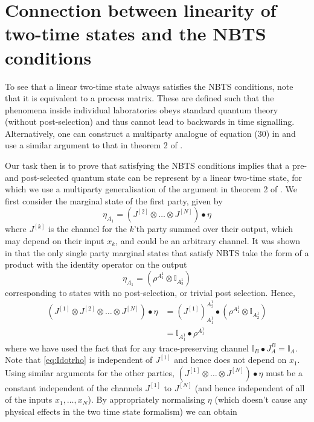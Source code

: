 \documentclass[aps,pra, twocolumn]{revtex4-1}
\begin{document}
\section{Connection between linearity of two-time states and the NBTS conditions} \label{ap:linearNBTS} 

To see that a linear two-time state always satisfies the NBTS conditions, note that it is equivalent to a process matrix. These are defined such that the phenomena inside individual laboratories obeys standard quantum theory (without post-selection) and thus cannot lead to backwards in time signalling. Alternatively, one can construct a multiparty analogue of equation (30) in \cite{polytope} and use a similar argument to that in theorem 2 of \cite{connectingprocesandtwotime}. 

Our task then is to prove that satisfying the NBTS conditions implies that a pre- and post-selected quantum state can be represent by a linear two-time state, for which we use a multiparty generalisation of the argument in theorem 2 of \cite{connectingprocesandtwotime}. We first consider the marginal state of the first party, given by 
\begin{equation}
\eta_{A_1}=(J^{[2]} \otimes \ldots \otimes  J^{[N]}) \bullet  \eta 
\end{equation}
where $J^{[k]}$ is the channel for the $k$'th party summed over their output, which may depend on their input $x_k$, and could be an arbitrary channel. It was shown in \cite{connectingprocesandtwotime} that the only single party marginal states that satisfy NBTS take the form of a product with the identity operator on the output
\begin{equation}
\eta_{A_1} = (\rho^{A_1^1} \otimes \mathbb{I}_{A_2^1})
\end{equation}
corresponding to states with no post-selection, or trivial post selection. Hence,
\begin{align}
(J^{[1]} \otimes J^{[2]} \otimes \ldots \otimes  J^{[N]}) \bullet  \eta &= (J^{[1]})_{A_1^1}^{A_2^1} \bullet (\rho^{A_1^1} \otimes \mathbb{I}_{A_2^1}) \nonumber \\
&=\mathbb{I}_{A_1^1} \bullet \rho^{A_1^1} \label{eq:Idotrho}
\end{align}
where we have used the fact that for any trace-preserving channel $\mathbb{I}_B \bullet J_A^B = \mathbb{I}_A  $. Note that \eqref{eq:Idotrho} is independent of $J^{[1]}$ and hence does not depend on $x_1$. Using similar arguments for the other parties, $(J^{[1]} \otimes \ldots \otimes  J^{[N]}) \bullet  \eta $ must be a constant independent of the channels $J^{[1]}$ to $J^{[N]}$ (and hence independent of all of the inputs $x_1, \ldots ,x_N$). By appropriately normalising $\eta$ (which doesn't cause any physical effects in the two time state formalism) we can obtain 
\end{document}
